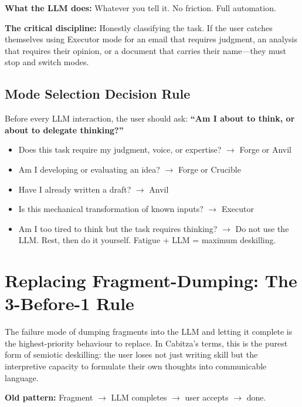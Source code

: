 \documentclass[11pt,a4paper]{article}
\begin{document}
\textbf{What the LLM does:} Whatever you tell it. No friction. Full automation.

\textbf{The critical discipline:} Honestly classifying the task. If the user
catches themselves using Executor mode for an email that requires judgment, an
analysis that requires their opinion, or a document that carries their name---they
must stop and switch modes.

\subsection{Mode Selection Decision Rule}

Before every LLM interaction, the user should ask: \textbf{``Am I about to think,
or about to delegate thinking?''}

\begin{itemize}
    \item Does this task require my judgment, voice, or expertise? $\rightarrow$
    Forge or Anvil
    \item Am I developing or evaluating an idea? $\rightarrow$ Forge or Crucible
    \item Have I already written a draft? $\rightarrow$ Anvil
    \item Is this mechanical transformation of known inputs? $\rightarrow$
    Executor
    \item Am I too tired to think but the task requires thinking? $\rightarrow$
    Do not use the LLM. Rest, then do it yourself. Fatigue + LLM = maximum
    deskilling.
\end{itemize}

\section{Replacing Fragment-Dumping: The 3-Before-1 Rule}
\label{sec:fragment}

The failure mode of dumping fragments into the LLM and letting it complete is the
highest-priority behaviour to replace. In Cabitza's terms, this is the purest
form of semiotic deskilling: the user loses not just writing skill but the
interpretive capacity to formulate their own thoughts into communicable language.

\textbf{Old pattern:} Fragment $\rightarrow$ LLM completes $\rightarrow$ user
accepts $\rightarrow$ done.
\end{document}
